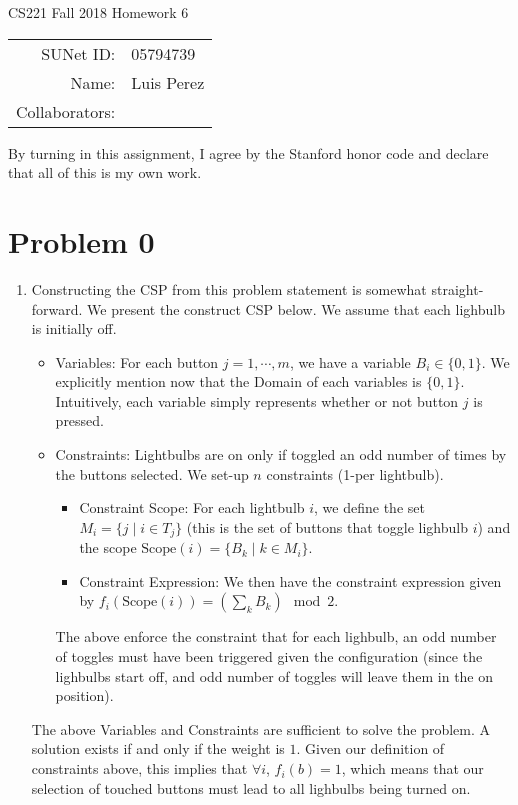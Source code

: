 \documentclass[12pt]{article}
\begin{document}
\begin{center}
{\Large CS221 Fall 2018 Homework 6}

\begin{tabular}{rl}
SUNet ID: & 05794739 \\
Name: & Luis Perez \\
Collaborators: &
\end{tabular}
\end{center}

By turning in this assignment, I agree by the Stanford honor code and declare
that all of this is my own work.

\section*{Problem 0}

\begin{enumerate}[label=(\alph*)]
  \item Constructing the CSP from this problem statement is somewhat straight-forward. We present the construct CSP below. We assume that each lighbulb is initially off.
  \begin{itemize}
    \item Variables: For each button $j = 1, \cdots, m$, we have a variable $B_i \in \{0,1\}$. We explicitly mention now that the Domain of each variables is $\{0,1\}$. Intuitively, each variable simply represents whether or not button $j$ is pressed.
    \item Constraints: Lightbulbs are on only if toggled an odd number of times by the buttons selected. We set-up $n$ constraints (1-per lightbulb).
    \begin{itemize}
      \item Constraint Scope: For each lightbulb $i$, we define the set $M_i = \{j \mid i \in T_j \}$ (this is the set of buttons that toggle lighbulb $i$) and the scope $\text{Scope}(i) = \{B_k \mid k \in M_i \}$.
      \item Constraint Expression: We then have the constraint expression given by $f_i(\text{Scope}(i)) = \left(\sum_{k} B_k\right) \mod 2$. 
    \end{itemize}
    The above enforce the constraint that for each lighbulb, an odd number of toggles must have been triggered given the configuration (since the lighbulbs start off, and odd number of toggles will leave them in the on position).
  \end{itemize}
  The above Variables and Constraints are sufficient to solve the problem. A solution exists if and only if the weight is $1$. Given our definition of constraints above, this implies that $\forall i$, $f_i(b) = 1$, which means that our selection of touched buttons must lead to all lighbulbs being turned on.


\end{enumerate}
\end{document}
